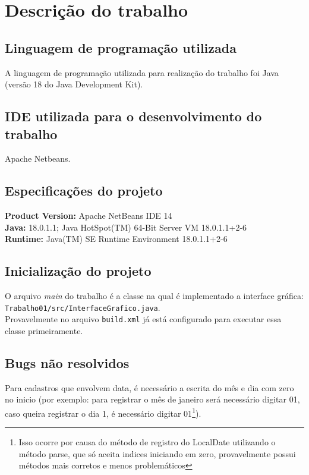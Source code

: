 \section{Descrição do trabalho}
\subsection{Linguagem de programação utilizada}
A linguagem de programação utilizada para realização do trabalho foi Java (versão 18 do Java Development Kit).

\subsection{IDE utilizada para o desenvolvimento do trabalho}
Apache Netbeans.

\subsection{Especificações do projeto}
\textbf{Product Version:} Apache NetBeans IDE 14\\
\textbf{Java:} 18.0.1.1; Java HotSpot(TM) 64-Bit Server VM 18.0.1.1+2-6\\
\textbf{Runtime:} Java(TM) SE Runtime Environment 18.0.1.1+2-6\\

\subsection{Inicialização do projeto}
O arquivo \textit{main} do trabalho é a classe na qual é implementado a interface gráfica:\\\texttt{Trabalho01/src/InterfaceGrafico.java}.\\
Provavelmente no arquivo \texttt{build.xml} já está configurado para executar essa classe primeiramente.

\subsection{Bugs não resolvidos}
Para cadastros que envolvem data, é necessário a escrita do mês e dia com zero no inicio (por exemplo: para registrar o mês de janeiro será necessário digitar 01, caso queira registrar o dia 1, é necessário digitar 01\footnote{Isso ocorre por causa do método de registro do LocalDate utilizando o método parse, que só aceita indices iniciando em zero, provavelmente possui métodos mais corretos e menos problemáticos}).
\newpage